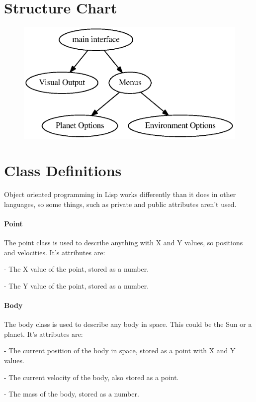 \section{Structure Chart}
\begin{figure}[h]
	\includegraphics[width=\textwidth]{./img/hier.eps}
\end{figure}

\section{Class Definitions}
Object oriented programming in Lisp works differently than it does in other
languages, so some things, such as private and public attributes aren't used. 

\paragraph{Point} The point class is used to describe anything with X and Y
values, so positions and velocities. It's attributes are:
\begin{description}[\parindent]
	\item[X] - The X value of the point, stored as a number.
	\item[Y] - The Y value of the point, stored as a number.
\end{description}

\paragraph{Body} The body class is used to describe any body in space. This
could be the Sun or a planet. It's attributes are:
\begin{description}[\parindent]
	\item[pos] - The current position of the body in space, stored as a
		point with X and Y values.
	\item[vel] - The current velocity of the body, also stored as a point.
	\item[mass] - The mass of the body, stored as a number.
\end{description} \\

